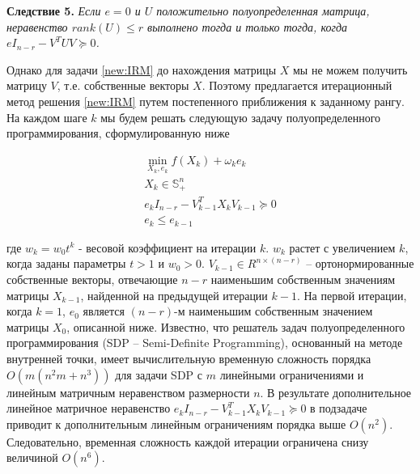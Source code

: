\documentclass[oneside,final,14pt]{extreport} %
\begin{document}
\textbf{Следствие 5.}
{\it Если $e = 0$ и $U$ положительно полуопределенная матрица, неравенство $rank(U) \le r$ выполнено тогда и только тогда, когда $eI_{n-r} - V^TUV \succeq 0$.
}

Однако для задачи \ref{new:IRM} до нахождения матрицы $X$ мы не можем получить матрицу $V$, т.е. собственные векторы $X$. Поэтому предлагается итерационный метод решения \ref{new:IRM} путем постепенного приближения к заданному рангу. На каждом шаге $k$ мы будем решать следующую задачу полуопределенного программирования, сформулированную ниже

\begin{equation}
	\label{new:IRM2}
	\begin{split}
		\min_{X_k,e_k} f(X_k) + \omega_k e_k \\ X_k \in \mathbb{S}_+^n \\e_kI_{n-r} - V_{k-1}^T X_kV_{k-1} \succeq 0 \\ e_k \le e_{k-1}	
	\end{split}
\end{equation}

где $w_k = w_0t^k$ - весовой коэффициент на итерации $k$. $w_k$ растет с увеличением $k$, когда заданы параметры $t > 1$ и $w_0 > 0$. $V_{k-1} \in R^{n \times (n - r)} $ -- ортонормированные собственные векторы, отвечающие $n - r$ наименьшим собственным значениям матрицы $X_{k-1}$, найденной на предыдущей итерации $k - 1$. На первой итерации, когда $k = 1$, $e_0$ является $(n - r)$-м наименьшим собственным значением матрицы $X_0$, описанной ниже. Известно, что решатель задач полуопределенного программирования (SDP -- Semi-Definite Programming), основанный на методе внутренней точки, имеет вычислительную временную сложность порядка $O(m (n ^ 2m + n ^ 3))$ для задачи SDP с $m$ линейными ограничениями и линейным матричным неравенством размерности $n$. В результате дополнительное линейное матричное неравенство $e_kI_{n-r} - V_{k-1}^T X_kV_{k-1} \succeq 0$ в подзадаче приводит к дополнительным линейным ограничениям порядка выше $O(n^2)$. Следовательно, временная сложность каждой итерации ограничена снизу величиной $O(n ^ 6)$.
\end{document}
